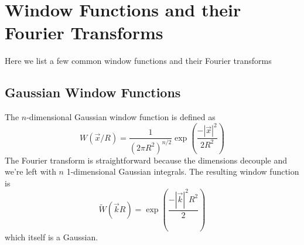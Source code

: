 \section{Window Functions and their Fourier Transforms}
\label{app:sec:Wtransforms}
Here we list a few common window functions and their Fourier transforms
\subsection{Gaussian Window Functions}
The $n$-dimensional Gaussian window function is defined as
\begin{equation}
  W(\vec x/R) = \frac{1}{(2\pi R^2)^{n/2}}
  \exp\left(\frac{-|\vec x|^2}{2R^2}\right)
\end{equation}
The Fourier transform is straightforward because the dimensions decouple
and we're left with $n$ 1-dimensional Gaussian integrals.  The resulting
window function is
\begin{equation}
  \widetilde{W}(\vec k R) 
  = \exp\left(\frac{-|\vec k|^2R^2}{2}\right)
\end{equation}
which itself is a Gaussian.
